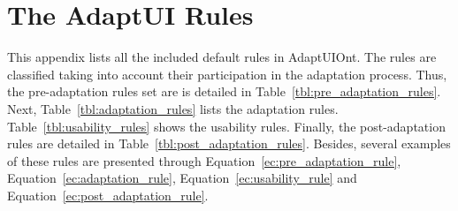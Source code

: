 
\chapter{The AdaptUI Rules}
\label{cha:appendixB}

This appendix lists all the included default rules in AdaptUIOnt. The rules
are classified taking into account their participation in the adaptation process.
Thus, the pre-adaptation rules set are is detailed in Table~\ref{tbl:pre_adaptation_rules}.
Next, Table~\ref{tbl:adaptation_rules} lists the adaptation rules. Table~\ref{tbl:usability_rules}
shows the usability rules. Finally, the post-adaptation rules are detailed in 
Table~\ref{tbl:post_adaptation_rules}. Besides, several examples of these rules
are presented through Equation~\ref{ec:pre_adaptation_rule}, 
Equation~\ref{ec:adaptation_rule}, Equation~\ref{ec:usability_rule} and
Equation~\ref{ec:post_adaptation_rule}.

